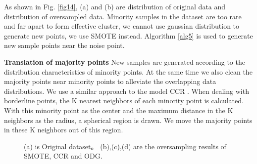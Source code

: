 \documentclass[ida]{iosart2x}
\begin{document}
As shown in Fig. \ref{fig14}, (a) and (b) are distribution of original data and 
distribution of oversampled data.
Minority samples in the dataset are too rare and far apart to form effective cluster, we cannot use
gaussian distribution to generate new points, we use SMOTE instead.
Algorithm \ref{alg5} is used to generate new sample points near the noise point.

\textbf{Translation of majority points}
New samples are generated according to the 
distribution characteristics of minority points. 
At the same time we also clean the majority points
 near minority points to alleviate the overlapping data distributions.
We use a similar approach to the model CCR \cite{2017CCR}.
When dealing with borderline points, 
the K nearest neighbors of each minority point is calculated. 
With this minority point as the center and the maximum distance in the K neighbors as the radius, 
a spherical region is drawn. We move the majority points in these K neighbors out of this region.

\begin{figure}[tb]
  \centering
  \quad
  \quad
  \quad
  \caption{(a) is Original dataset。
  (b),(c),(d) are the oversampling results of SMOTE, CCR and ODG.}
  \label{fig18}
  \end{figure}
\end{document}
